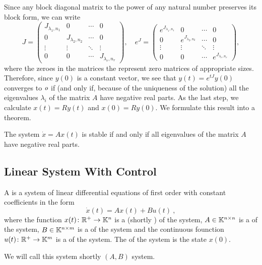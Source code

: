 Since any block diagonal matrix to the power of any natural number preserves its block form, we can write
\begin{equation*}
	J=
	\begin{pmatrix}
		J_{\lambda_1,n_1} & 0 & \cdots & 0 \\
		0 & J_{\lambda_2,n_2} & \cdots & 0 \\
		\vdots & \vdots & \ddots & \vdots \\
		0 & 0 & \cdots & J_{\lambda_r,n_r}
	\end{pmatrix},
	\quad 
	e^J=
	\begin{pmatrix}
		e^{J_{\lambda_1,n_1}} & 0 & \cdots & 0 \\
		0 & e^{J_{\lambda_2,n_2}} & \cdots & 0 \\
		\vdots & \vdots & \ddots & \vdots \\
		0 & 0 & \cdots & e^{J_{\lambda_r,n_r}}
	\end{pmatrix}
	,
\end{equation*}
where the zeroes in the matrices the represent zero matrices of appropriate sizes. Therefore, since $y(0)$ is a constant vector, we see that $y(t)=e^{tJ}y(0)$ converges to $\textit{o}$ if (and only if, because of the uniqueness of the solution) all the eigenvalues $\lambda_i$ of the matrix $A$ have negative real parts. As the last step, we calculate $x(t)=Ry(t)$ and $x(0)=Ry(0)$. We formulate this result into a theorem.

\begin{theorem}
\label{theorem:stability}
	The system $\dot{x}=Ax(t)$ is stable if and only if all eigenvalues of the matrix $A$ have negative real parts.
\end{theorem}

\subsection{Linear System With Control}

\begin{definition}
	A  is a system of linear differential equations of first order with constant coefficients in the form $$\dot{x}(t)=Ax(t)+Bu(t)\ ,$$ where the function $x(t)\colon\mathbb{R}^+\to\mathbb{K}^n$ is a  (shortly ) of the system, $A\in\mathbb{K}^{n\times n}$ is a  of the system, $B\in\mathbb{K}^{n\times m}$ is a  of the system and the continuous founction $u(t)\colon\mathbb{R}^+\to\mathbb{K}^m$ is a  of the system. The  of the system is the state $x(0)$.

	We will call this system shortly $(A,B)$ system.
\end{definition}

